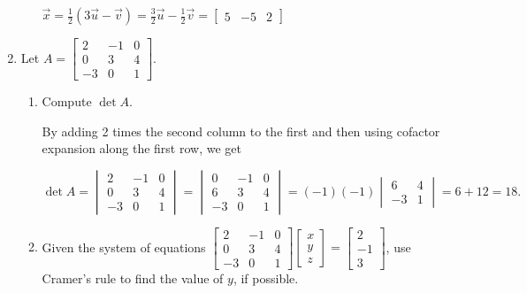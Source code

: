 \documentclass[12pt]{article}
\newcommand{\points}[1]{\marginpar{\hspace{24pt}[#1]}}
\begin{document}
\begin{enumerate}
\begin{enumerate}
$\vec{x} = \frac{1}{2}(3\vec{u}-\vec{v}) = \frac{3}{2}\vec{u}-\frac{1}{2}\vec{v} =  \begin{bmatrix} 5&-5&2\end{bmatrix}$

\end{enumerate}
\newpage

\item Let $A = \begin{bmatrix}2&-1&0\\0&3&4\\-3&0&1\end{bmatrix}$.
\begin{enumerate}
 \item Compute $\det A$. \points{5}

\bigskip

By adding 2 times the second column to the first and then using cofactor expansion along the first row, we get

\[
 \det{A} = \begin{vmatrix}2&-1&0\\0&3&4\\-3&0&1\end{vmatrix} = \begin{vmatrix}0&-1&0\\6&3&4\\-3&0&1\end{vmatrix} = (-1)(-1)\begin{vmatrix}6&4\\-3&1\end{vmatrix} = 6+12=18.
\]



 \item Given the system of equations $\begin{bmatrix}2&-1&0\\0&3&4\\-3&0&1\end{bmatrix}\begin{bmatrix}x\\y\\z\end{bmatrix} =\begin{bmatrix}2\\-1\\3\end{bmatrix}$, use Cramer's rule to find the value of $y$, if possible. \points{5}

\bigskip


\end{enumerate}
\end{enumerate}
\end{document}
